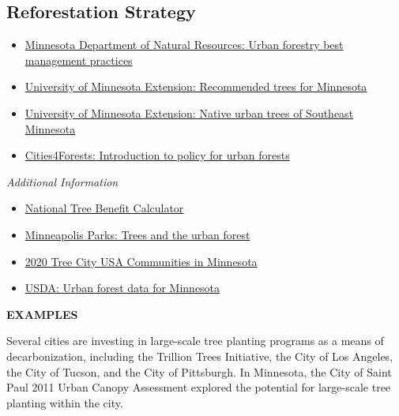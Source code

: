 \documentclass[
]{book}
\providecommand{\tightlist}{%
  \setlength{\itemsep}{0pt}\setlength{\parskip}{0pt}}
\begin{document}
\hypertarget{reforestation-strategy}{%
\subsection{Reforestation Strategy}\label{reforestation-strategy}}

\begin{itemize}
\tightlist
\item
  \href{https://www.dnr.state.mn.us/forestry/urban/bmps.html}{Minnesota Department of Natural Resources: Urban forestry best management practices}
\item
  \href{https://extension.umn.edu/tree-selection-and-care/recommended-trees-minnesota}{University of Minnesota Extension: Recommended trees for Minnesota}
\item
  \href{https://www.minnesotamasternaturalist.org/docs/invasive_blitz/native_urban_trees_of_se_mn.pdf}{University of Minnesota Extension: Native urban trees of Southeast Minnesota}
\item
  \href{https://cities4forests.com/lg-urban-forests/introduction-to-policy-for-urban-forests/}{Cities4Forests: Introduction to policy for urban forests}
\end{itemize}

\emph{Additional Information}

\begin{itemize}
\tightlist
\item
  \href{http://www.treebenefits.com/calculator/}{National Tree Benefit Calculator}
\item
  \href{https://www.minneapolisparks.org/park_care__improvements/trees/}{Minneapolis Parks: Trees and the urban forest}
\item
  \href{https://www.dnr.state.mn.us/forestry/urban/tree-city-usa-awards.html\#cities}{2020 Tree City USA Communities in Minnesota}
\item
  \href{https://www.nrs.fs.fed.us/data/urban/state/?state=MN}{USDA: Urban forest data for Minnesota}
\end{itemize}

\textbf{EXAMPLES}

Several cities are investing in large-scale tree planting programs as a means of decarbonization, including the Trillion Trees Initiative, the City of Los Angeles, the City of Tucson, and the City of Pittsburgh. In Minnesota, the City of Saint Paul 2011 Urban Canopy Assessment explored the potential for large-scale tree planting within the city.
\end{document}
